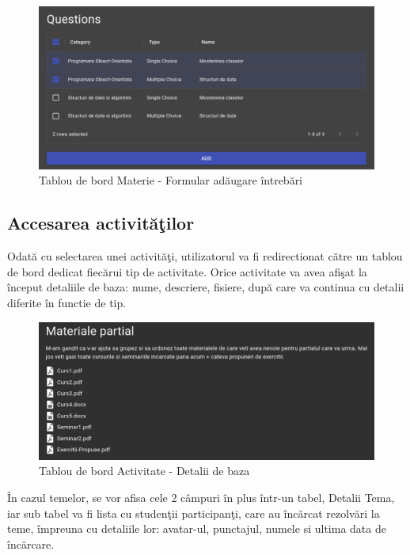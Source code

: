 \documentclass[12pt, a4paper, oneside, romanian]{teza-upb}
\begin{document}
\begin{figure}[H]
\centering
\includegraphics*[width=\columnwidth]{tablou-de-bord-materie-formular-adaugare-intrebari}
\caption{Tablou de bord Materie - Formular adăugare întrebări}
\label{tablou-de-bord-materie-formular-adaugare-intrebari}
\end{figure}

\subsection{Accesarea activităţilor}

Odată cu selectarea unei activităţi, utilizatorul va fi redirectionat către un tablou de bord dedicat fiecărui tip de activitate. Orice activitate va avea afişat la început detaliile de baza: nume, descriere, fisiere, după care va continua cu detalii diferite în functie de tip.

\begin{figure}[H]
\centering
\includegraphics*[width=\columnwidth]{tablou-de-bord-activitate-detalii-de-baza}
\caption{Tablou de bord Activitate - Detalii de baza}
\label{tablou-de-bord-activitate-detalii-de-baza}
\end{figure}

În cazul temelor, se vor afisa cele 2 câmpuri în plus într-un tabel, Detalii Tema, iar sub tabel va fi lista cu studenţii participanţi, care au încărcat rezolvări la teme, împreuna cu detaliile lor: avatar-ul, punctajul, numele si ultima data de încărcare.
\end{document}
